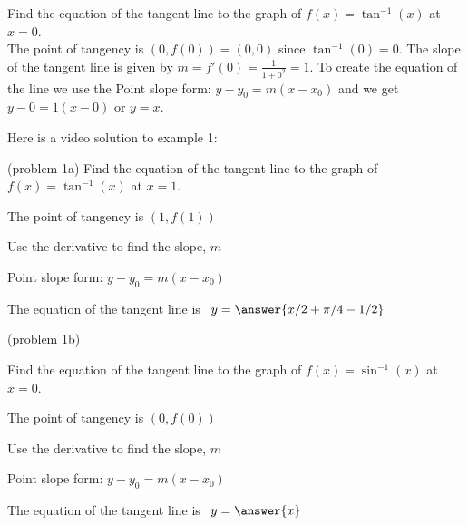 \documentclass[handout]{ximera}
\begin{document}
\begin{example}[example 1]

Find the equation of the tangent line to the graph of $f(x) = \tan^{-1}(x)$ at $x=0.$\\
The point of tangency is $(0, f(0)) = (0, 0)$ since $\tan^{-1}(0) = 0$.
The slope of the tangent line is given by  $m = f'(0) = \tfrac{1}{1+0^2} = 1$.
To create the equation of the line we use the
Point slope form: $y-y_0 = m(x-x_0)$ and we get $y-0 = 1(x-0)$ or $y=x$.

\end{example}


Here is a video solution to example 1:
\begin{foldable}
\end{foldable}


\begin{problem}(problem 1a)
Find the equation of the tangent line to the graph of $f(x) = \tan^{-1}(x)$ at $x=1.$

\begin{hint}
The point of tangency is $(1, f(1))$
\end{hint}
\begin{hint}
Use the derivative to find the slope, $m$
\end{hint}
\begin{hint}
Point slope form: $y-y_0 = m(x-x_0)$
\end{hint}

The equation of the tangent line is \ $y = \answer{x/2 + \pi/4 - 1/2}$

\end{problem}



\begin{problem}(problem 1b)

Find the equation of the tangent line to the graph of $f(x) = \sin^{-1}(x)$ at $x=0.$

\begin{hint}
The point of tangency is $(0, f(0))$
\end{hint}
\begin{hint}
Use the derivative to find the slope, $m$
\end{hint}
\begin{hint}
Point slope form: $y-y_0 = m(x-x_0)$
\end{hint}

The equation of the tangent line is \ $y = \answer{x}$

\end{problem}
\end{document}
